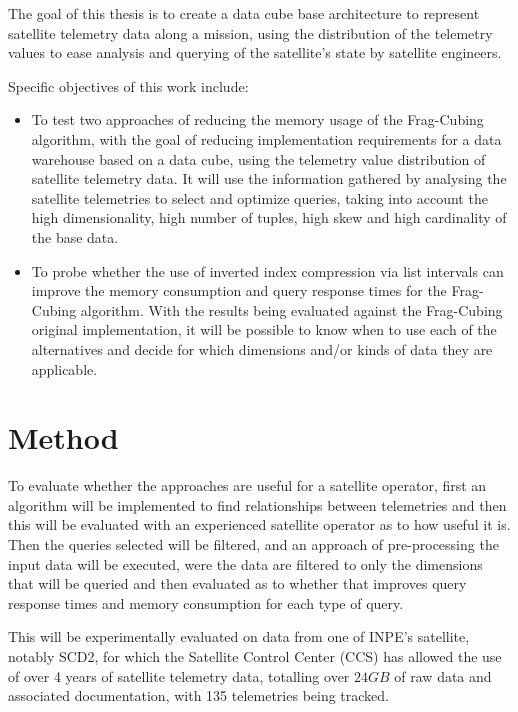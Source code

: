 The goal of this thesis is to create a data cube base architecture to represent satellite telemetry data along a mission, using the distribution of the telemetry values to ease analysis and querying of the satellite's state by satellite engineers.

Specific objectives of this work include:

\begin{itemize}[noitemsep]
  \item To test two approaches of reducing the memory usage of the Frag-Cubing algorithm, with the goal of reducing implementation requirements for a data warehouse based on a data cube, using the telemetry value distribution of satellite telemetry data.
It will use the information gathered by analysing the satellite telemetries to select and optimize queries, taking into account the high dimensionality, high number of tuples, high skew and high cardinality of the base data.
  \item To probe whether the use of inverted index compression via list intervals can improve the memory consumption and query response times for the Frag-Cubing algorithm.
  With the results being evaluated against the Frag-Cubing original implementation, it will be possible to know when to use each of the alternatives and decide for which dimensions and/or kinds of data they are applicable.
\end{itemize}

\section{Method}\label{ch:intro:method}

To evaluate whether the approaches are useful for a satellite operator, first an algorithm will be implemented to find relationships between telemetries and then this will be evaluated with an experienced satellite operator as to how useful it is.
Then the queries selected will be filtered, and an approach of pre-processing the input data will be executed, were the data are filtered to only the dimensions that will be queried and then evaluated as to whether that improves query response times and memory consumption for each type of query.

This will be experimentally evaluated on data from one of INPE's satellite, notably SCD2, for which the Satellite Control Center (CCS) has allowed the use of over 4 years of satellite telemetry data, totalling over $24GB$ of raw data and associated documentation, with 135 telemetries being tracked.

